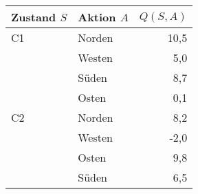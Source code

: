 \begin{tabular}{llr}
\toprule
Zustand $S$ & Aktion $A$    & $Q(S,A)$ \\ \midrule
C1          & Norden        & 10,5     \\
            & Westen        & 5,0      \\
            & Süden         & 8,7      \\
            & Osten         & 0,1      \\ \cmidrule{1-3}
C2          & Norden        & 8,2      \\ 
            & Westen        & -2,0     \\
            & Osten         & 9,8      \\
            & Süden         & 6,5      \\ \bottomrule
\end{tabular}

